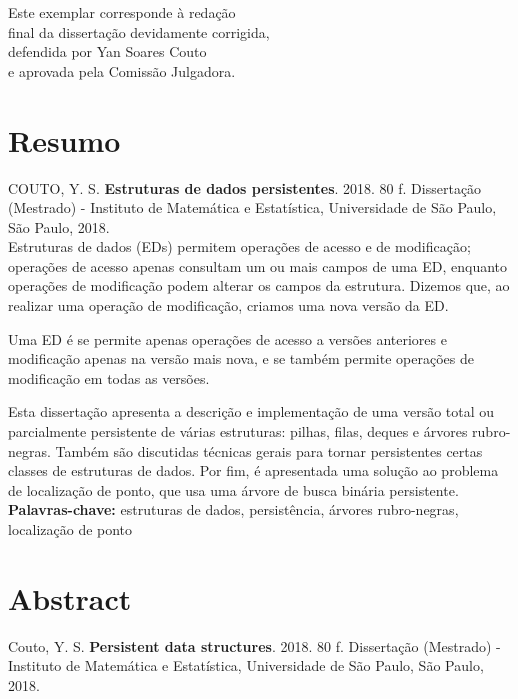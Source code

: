 \documentclass[11pt,oneside,a4paper, openany]{book}
\begin{document}
    \vskip 2cm

    \begin{flushright}
	Este exemplar corresponde à redação \\
	final da dissertação devidamente corrigida, \\
	defendida por Yan Soares Couto \\
	e aprovada pela Comissão Julgadora.
    \end{flushright}

\pagebreak


\chapter*{Resumo}

\noindent COUTO, Y. S. \textbf{Estruturas de dados persistentes}.
2018. 80 f.
Dissertação (Mestrado) - Instituto de Matemática e Estatística,
Universidade de São Paulo, São Paulo, 2018.
\\

Estruturas de dados (EDs) permitem operações de acesso e de modificação; operações de acesso apenas consultam um ou mais campos de uma ED, enquanto operações de modificação podem alterar os campos da estrutura. Dizemos que, ao realizar uma operação de modificação, criamos uma nova versão da ED.

Uma ED é  se permite apenas operações de acesso a versões anteriores e modificação apenas na versão mais nova, e  se também permite operações de modificação em todas as versões.

Esta dissertação apresenta a descrição e implementação de uma versão total ou parcialmente persistente de várias estruturas: pilhas, filas, deques e árvores rubro-negras. Também são discutidas técnicas gerais para tornar persistentes certas classes de estruturas de dados. Por fim, é apresentada uma solução ao problema de localização de ponto, que usa uma árvore de busca binária persistente.
\\

\noindent \textbf{Palavras-chave:} estruturas de dados, persistência, árvores rubro-negras, localização de ponto

\chapter*{Abstract}
\noindent Couto, Y. S. \textbf{Persistent data structures}. 
2018. 80 f.
Dissertação (Mestrado) - Instituto de Matemática e Estatística,
Universidade de São Paulo, São Paulo, 2018.
\\
\end{document}
